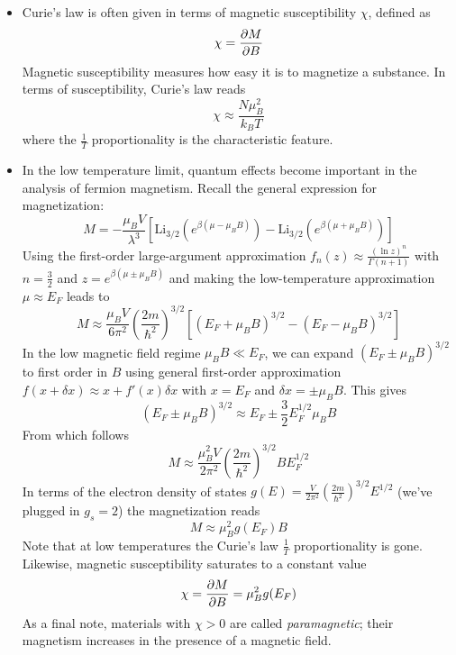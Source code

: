 \documentclass[11pt, a4paper]{article}
\begin{document}
\begin{itemize}
	\item Curie's law is often given in terms of magnetic susceptibility $ \chi $, defined as
	\begin{equation*}
		\chi = \pdv{M}{B}
	\end{equation*}
 	Magnetic susceptibility measures how easy it is to magnetize a substance. In terms of susceptibility, Curie's law reads
 	\begin{equation*}
	 	\chi \approx \frac{N\mu_{B}^{2}}{k_{B}T}
 	\end{equation*}
 	where the $ \frac{1}{T} $ proportionality is the characteristic feature.
 	
 	\item In the low temperature limit, quantum effects become important in the analysis of fermion magnetism. Recall the general expression for magnetization:
	\begin{equation*}
		M = - \frac{\mu_{B}V}{\lambda^{3}} \left[\mathrm{Li}_{3/2}\left (e^{\beta(\mu - \mu_{B}B)}\right ) - \mathrm{Li}_{3/2}\left (e^{\beta(\mu + \mu_{B}B)}\right )\right]
	\end{equation*}
	Using the first-order large-argument approximation $ f_{n}(z) \approx \frac{(\ln z)^{n}}{\Gamma(n+1)} $ with $ n = \frac{3}{2} $ and $ z =  e^{\beta(\mu \pm \mu_{B}B)} $ and making the low-temperature approximation $ \mu \approx E_{F} $ leads to
	\begin{equation*}
		M \approx \frac{\mu_{B}V}{6\pi^{2}} \left(\frac{2m}{\hbar^{2}}\right)^{3/2}\left[(E_{F} + \mu_{B}B)^{3/2} - (E_{F} - \mu_{B}B)^{3/2}  \right]
	\end{equation*}
	In the low magnetic field regime $ \mu_{B}B \ll E_{F} $, we can expand $ (E_{F} \pm \mu_{B}B)^{3/2} $ to first order in $ B $ using general first-order approximation $ f(x + \delta x) \approx x + f'(x) \delta x $ with $ x = E_{F} $ and $ \delta x = \pm \mu_{B}B $. This gives
	\begin{equation*}
		(E_{F} \pm \mu_{B} B)^{3/2} \approx E_{F} \pm \frac{3}{2} E_{F}^{1/2} \mu_{B}B
	\end{equation*}
	From which follows
	\begin{equation*}
		M \approx \frac{\mu_{B}^{2}V}{2\pi^{2}} \left(\frac{2m}{\hbar^{2}}\right)^{3/2} B E_{F}^{1/2}
	\end{equation*} 
	In terms of the electron density of states $ g(E) = \frac{V}{2\pi^{2}}\left(\frac{2m}{\hbar^{2}}\right)^{3/2}E^{1/2}$ (we've plugged in $ g_{s} = 2 $) the magnetization reads
	\begin{equation*}
			M \approx \mu_{B}^{2} g(E_{F}) B
	\end{equation*}
	Note that at low temperatures the Curie's law $ \frac{1}{T} $ proportionality is gone. Likewise, magnetic susceptibility saturates to a constant value
	\begin{equation*}
		\chi = \pdv{M}{B} = \mu_{B}^{2} g(E_{F})
	\end{equation*}
	As a final note, materials with $ \chi > 0 $ are called \textit{paramagnetic}; their magnetism increases in the presence of a magnetic field. 
\end{itemize}
\end{document}
